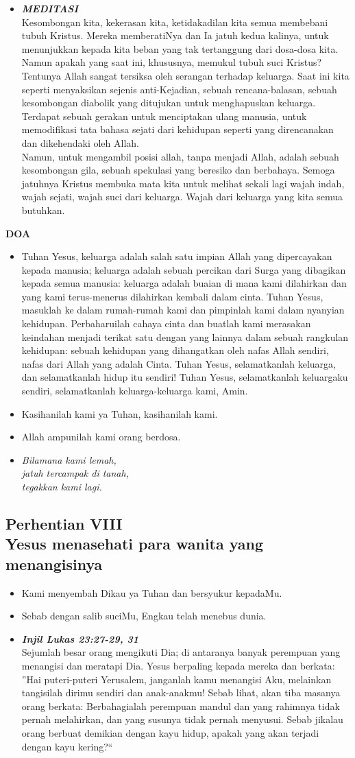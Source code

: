 \documentclass[a5paper,titlepage,11pt,openany]{scrbook}
\newcommand{\BU}[1]{\begin{itemize} \item[U:] #1 \end{itemize}}
\newcommand{\BP}[1]{\begin{itemize} \item[P:] #1 \end{itemize}}
\newcommand{\kamiMenyembah}{\BP{ Kami menyembah Dikau ya Tuhan dan bersyukur kepadaMu.}
\BU{Sebab dengan salib suciMu, Engkau telah menebus dunia.}
}
\newcommand{\kasihanilahKami}{\BP{Kasihanilah kami ya Tuhan, kasihanilah kami.}
\BU{Allah ampunilah kami orang berdosa.}}
\newcommand{\BPi}[2]
{\begin{itemize} \item[P1:] \textbf{\emph{#1}}\\#2 \end{itemize}}
\newcommand{\BPii}[1]
{\begin{itemize} \item[P2:] \textbf{\emph{MEDITASI}}\\#1 \end{itemize}}
\newcommand{\lagu}[2]{%
\begin{itemize}
\item[#1.] \it{#2}
\end{itemize}}
\newcommand{\henti}[2]{%
\subsection*{Perhentian #1\\#2 } 
\kamiMenyembah
}
\begin{document}
\BPii{
	Kesombongan kita, kekerasan kita, ketidakadilan kita semua membebani tubuh Kristus. Mereka memberatiNya dan Ia jatuh kedua kalinya, untuk menunjukkan kepada kita beban yang tak tertanggung dari dosa-dosa kita. Namun apakah yang saat ini, khususnya, memukul tubuh suci Kristus? Tentunya Allah sangat tersiksa oleh serangan terhadap keluarga. Saat ini kita seperti menyaksikan sejenis anti-Kejadian, sebuah rencana-balasan, sebuah kesombongan diabolik yang ditujukan untuk menghapuskan keluarga. Terdapat sebuah gerakan untuk menciptakan ulang manusia, untuk memodifikasi tata bahasa sejati dari kehidupan seperti yang direncanakan dan dikehendaki oleh Allah. \\
	Namun, untuk mengambil posisi allah, tanpa menjadi Allah, adalah sebuah kesombongan gila, sebuah spekulasi yang beresiko dan berbahaya. Semoga jatuhnya Kristus membuka mata kita untuk melihat sekali lagi wajah indah, wajah sejati, wajah suci dari keluarga. Wajah dari keluarga yang kita semua butuhkan.}

\textbf{DOA}

\BU{Tuhan Yesus, keluarga adalah salah satu impian Allah yang dipercayakan kepada manusia; keluarga adalah sebuah percikan dari Surga yang dibagikan kepada semua manusia: keluarga adalah buaian di mana kami dilahirkan dan yang kami terus-menerus dilahirkan kembali dalam cinta. Tuhan Yesus, masuklah ke dalam rumah-rumah kami dan pimpinlah kami dalam nyanyian kehidupan. Perbaharuilah cahaya cinta dan buatlah kami merasakan keindahan menjadi terikat satu dengan yang lainnya dalam sebuah rangkulan kehidupan: sebuah kehidupan yang dihangatkan oleh nafas Allah sendiri, nafas dari Allah yang adalah Cinta. Tuhan Yesus, selamatkanlah keluarga, dan selamatkanlah hidup itu sendiri! Tuhan Yesus, selamatkanlah keluargaku sendiri, selamatkanlah keluarga-keluarga kami, Amin.}


\kasihanilahKami

\lagu{8}{Bilamana kami lemah,\\
jatuh tercampak di tanah, \\
tegakkan kami lagi.}

\henti{VIII}{Yesus menasehati para wanita yang menangisinya}

\BPi{	Injil Lukas 23:27-29, 31 }{

	Sejumlah besar orang mengikuti Dia; di antaranya banyak perempuan yang menangisi dan meratapi Dia. Yesus berpaling kepada mereka dan berkata: ''Hai puteri-puteri Yerusalem, janganlah kamu menangisi Aku, melainkan tangisilah dirimu sendiri dan anak-anakmu! Sebab lihat, akan tiba masanya orang berkata: Berbahagialah perempuan mandul dan yang rahimnya tidak pernah melahirkan, dan yang susunya tidak pernah menyusui. Sebab jikalau orang berbuat demikian dengan kayu hidup, apakah yang akan terjadi dengan kayu kering?`` }
\end{document}
